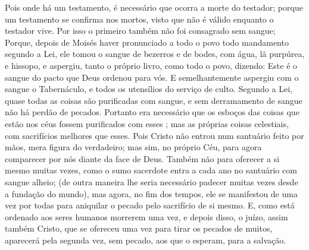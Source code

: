 {  Pois onde há um testamento, é necessário que ocorra a morte do testador;
  porque um testamento se confirma nos mortos, visto que não é válido enquanto o testador vive.
  Por isso o primeiro
{} também não foi consagrado sem sangue;
  Porque, depois de Moisés haver pronunciado a todo o povo todo mandamento segundo a Lei, ele tomou o sangue de bezerros e de bodes, com água, lã purpúrea, e hissopo, e aspergiu, tanto o próprio livro, como todo o povo,
  dizendo: Este é o sangue do pacto que Deus ordenou para vós.
{}
  E semelhantemente aspergiu com o sangue o Tabernáculo, e todos os utensílios do serviço de culto.
  Segundo a Lei, quase todas as coisas são purificadas com sangue, e sem derramamento de sangue não há perdão de pecados.
  Portanto era necessário que os esboços das coisas que estão nos céus fossem purificados com esses
{} ; mas as próprias coisas celestiais, com sacrifícios melhores que esses.
  Pois Cristo não entrou num santuário feito por mãos, mera figura do verdadeiro; mas sim, no próprio Céu, para agora comparecer por nós diante da face de Deus.
  Também não
{} para oferecer a si mesmo muitas vezes, como o sumo sacerdote entra a cada ano no santuário com sangue alheio;
  (de outra maneira lhe seria necessário padecer muitas vezes desde a fundação do mundo), mas agora, no fim dos tempos, ele se manifestou de uma vez por todas para aniquilar o pecado pelo sacrifício de si mesmo.
  E, como está ordenado aos seres humanos morrerem uma vez, e depois disso, o juízo,
  assim também Cristo, que se ofereceu uma vez para tirar os pecados de muitos, aparecerá pela segunda vez, sem pecado, aos que o esperam, para a salvação.
\par }

